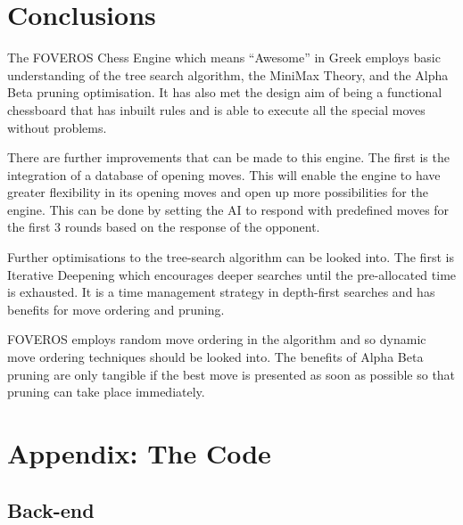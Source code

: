 \documentclass[11pt,a4paper]{article}
\begin{document}
\newpage
\section{Conclusions}

\indent\indent The FOVEROS Chess Engine which means “Awesome” in Greek employs basic understanding of the tree search algorithm, the MiniMax Theory, and the Alpha Beta pruning optimisation. It has also met the design aim of being a functional chessboard that has inbuilt rules and is able to execute all the special moves without problems.

	There are further improvements that can be made to this engine. The first is the integration of a database of opening moves. This will enable the engine to have greater flexibility in its opening moves and open up more possibilities for the engine. This can be done by setting the AI to respond with predefined moves for the first 3 rounds based on the response of the opponent.

	Further optimisations to the tree-search algorithm can be looked into. The first is Iterative Deepening which encourages deeper searches until the pre-allocated time is exhausted. It is a time management strategy in depth-first searches and has benefits for move ordering and pruning.\cite{chess9}

	FOVEROS employs random move ordering in the algorithm and so dynamic move ordering techniques should be looked into. The benefits of Alpha Beta pruning are only tangible if the best move is presented as soon as possible so that pruning can take place immediately.\cite{chess8}
 


\newpage


\newpage

\appendix
\section{Appendix: The Code}
\subsection{Back-end}
\end{document}
